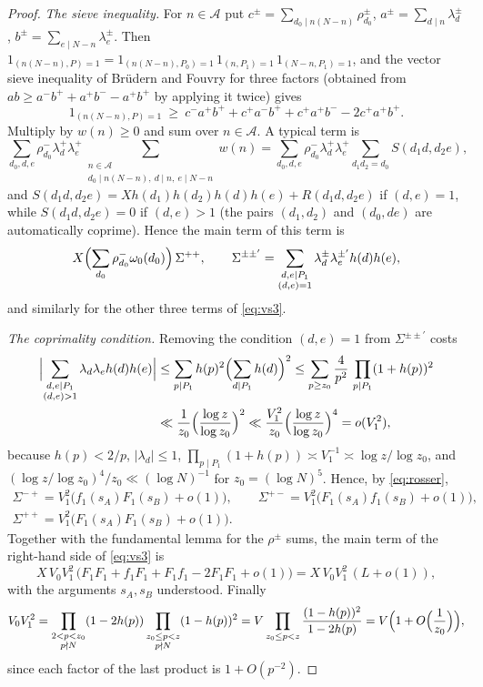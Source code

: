 \documentclass[11pt]{amsart}
\theoremstyle{remark}
\newcommand{\cA}{\mathcal{A}}
\begin{document}
\begin{proof}
\emph{The sieve inequality.} For $n\in\cA$ put $c^\pm=\sum_{d_0\mid n(N-n)}\rho^\pm_{d_0}$, $a^\pm=\sum_{d\mid n}\lambda^\pm_d$, $b^\pm=\sum_{e\mid N-n}\lambda^\pm_e$. Then $1_{(n(N-n),P)=1}=1_{(n(N-n),P_0)=1}\,1_{(n,P_1)=1}\,1_{(N-n,P_1)=1}$, and the vector sieve inequality of Br\"udern and Fouvry \cite{BF} for three factors (obtained from $ab\ge a^-b^++a^+b^--a^+b^+$ by applying it twice) gives
\begin{equation}\label{eq:vs3}
1_{(n(N-n),P)=1}\ \ge\ c^-a^+b^++c^+a^-b^++c^+a^+b^--2c^+a^+b^+ .
\end{equation}
Multiply by $w(n)\ge0$ and sum over $n\in\cA$. A typical term is
\[
\sum_{d_0,d,e}\rho^-_{d_0}\lambda^+_d\lambda^+_e\sum_{\substack{n\in\cA\\ d_0\mid n(N-n),\ d\mid n,\ e\mid N-n}}w(n)
=\sum_{d_0,d,e}\rho^-_{d_0}\lambda^+_d\lambda^+_e\sum_{d_1d_2=d_0}S(d_1d,d_2e),
\]
and $S(d_1d,d_2e)=Xh(d_1)h(d_2)h(d)h(e)+R(d_1d,d_2e)$ if $(d,e)=1$, while $S(d_1d,d_2e)=0$ if $(d,e)>1$ (the pairs $(d_1,d_2)$ and $(d_0,de)$ are automatically coprime). Hence the main term of this term is
\[
X\Bigl(\sum_{d_0}\rho^-_{d_0}\omega_0(d_0)\Bigr)\,\Sigma^{++},\qquad
\Sigma^{\pm\pm'}=\sum_{\substack{d,e\mid P_1\\ (d,e)=1}}\lambda^\pm_d\lambda^{\pm'}_eh(d)h(e),
\]
and similarly for the other three terms of \eqref{eq:vs3}.

\emph{The coprimality condition.} Removing the condition $(d,e)=1$ from $\Sigma^{\pm\pm'}$ costs
\begin{align*}
\Bigl|\sum_{\substack{d,e\mid P_1\\ (d,e)>1}}\lambda_d\lambda_eh(d)h(e)\Bigr|
&\le\sum_{p\mid P_1}h(p)^2\Bigl(\sum_{d\mid P_1}h(d)\Bigr)^2
\le\sum_{p\ge z_0}\frac4{p^2}\,\prod_{p\mid P_1}(1+h(p))^2\\
&\ll\frac1{z_0}\Bigl(\frac{\log z}{\log z_0}\Bigr)^2\ll\frac{V_1^2}{z_0}\Bigl(\frac{\log z}{\log z_0}\Bigr)^4=o(V_1^2),
\end{align*}
because $h(p)<2/p$, $|\lambda_d|\le1$, $\prod_{p\mid P_1}(1+h(p))\asymp V_1^{-1}\asymp\log z/\log z_0$, and $(\log z/\log z_0)^4/z_0\ll(\log N)^{-1}$ for $z_0=(\log N)^5$. Hence, by \eqref{eq:rosser},
\begin{gather*}
\Sigma^{-+}=V_1^2\bigl(f_1(s_A)F_1(s_B)+o(1)\bigr),\qquad
\Sigma^{+-}=V_1^2\bigl(F_1(s_A)f_1(s_B)+o(1)\bigr),\\
\Sigma^{++}=V_1^2\bigl(F_1(s_A)F_1(s_B)+o(1)\bigr).
\end{gather*}
Together with the fundamental lemma for the $\rho^\pm$ sums, the main term of the right-hand side of \eqref{eq:vs3} is
\[
X\,V_0V_1^2\,\bigl(F_1F_1+f_1F_1+F_1f_1-2F_1F_1+o(1)\bigr)=X\,V_0V_1^2\,(L+o(1)),
\]
with the arguments $s_A,s_B$ understood. Finally
\[
V_0V_1^2=\prod_{\substack{2<p<z_0\\ p\nmid N}}(1-2h(p))\prod_{\substack{z_0\le p<z\\ p\nmid N}}(1-h(p))^2
=V\prod_{z_0\le p<z}\frac{(1-h(p))^2}{1-2h(p)}=V\Bigl(1+O\Bigl(\frac1{z_0}\Bigr)\Bigr),
\]
since each factor of the last product is $1+O(p^{-2})$.


\end{proof}
\end{document}
